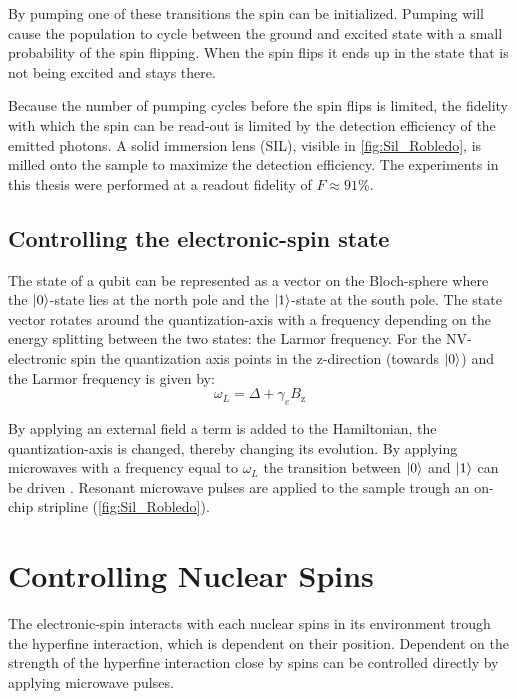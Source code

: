 By pumping one of these transitions the spin can be initialized.
Pumping will cause the population to cycle between the ground and excited state with a small probability of the spin flipping.
When the spin flips it ends up in the state that is not being excited and stays there.

Because the number of pumping cycles before the spin flips is limited, the fidelity with which the spin can be read-out is limited by the detection efficiency of the emitted photons.
A solid immersion lens (SIL), visible in \cref{fig:Sil_Robledo}, is milled onto the sample to maximize the detection efficiency.
The experiments in this thesis were performed at a readout fidelity of $F\approx 91\%$.

\subsection{Controlling the electronic-spin state}
The state of a qubit can be represented as a vector on the Bloch-sphere where the ${\left\vert{0}\right\rangle}$-state lies at the north pole and the ${\left\vert{1}\right\rangle}$-state at the south pole.
The state vector rotates around the quantization-axis with a frequency depending on the energy splitting between the two states: the Larmor frequency.
For the NV-electronic spin the quantization axis points in the z-direction (towards ${\left\vert{0}\right\rangle}$) and the  Larmor frequency is given by:
\begin{equation}
    \omega_L =\Delta + \gamma_e {B_\mathrm{z}}
    \label{eq:larmor_electronic_spin}
\end{equation}


By applying an external field a term is added to the Hamiltonian, the quantization-axis is changed, thereby changing its evolution.
By applying microwaves with a frequency equal to $\omega_L$ the transition between ${\left\vert{0}\right\rangle}$ and ${\left\vert{1}\right\rangle}$ can be driven \citep{Jelezko2004Observation}.
Resonant microwave pulses are applied to the sample trough an on-chip stripline (\cref{fig:Sil_Robledo}).

\section{Controlling Nuclear Spins}
The electronic-spin interacts with each nuclear spins in its environment trough the hyperfine interaction, which is dependent on their position.
Dependent on the strength of the hyperfine interaction close by spins can be controlled directly by applying microwave pulses.

